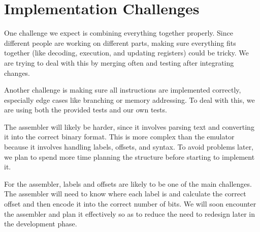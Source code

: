 \documentclass[11pt]{article}
\begin{document}
\section{Implementation Challenges}

One challenge we expect is combining everything together properly. Since different people are working on different parts, making sure everything fits together (like decoding, execution, and updating registers) could be tricky. We are trying to deal with this by merging often and testing after integrating changes.

Another challenge is making sure all instructions are implemented correctly, especially edge cases like branching or memory addressing. To deal with this, we are using both the provided tests and our own tests.

The assembler will likely be harder, since it involves parsing text and converting it into the correct binary format. This is more complex than the emulator because it involves handling labels, offsets, and syntax. To avoid problems later, we plan to spend more time planning the structure before starting to implement it.

For the assembler, labels and offsets are likely to be one of the main challenges. The assembler will need to know where each label is and calculate the correct offset and then encode it into the correct number of bits. We will soon encounter the assembler and plan it effectively so as to reduce the need to redesign later in the development phase.
\end{document}
